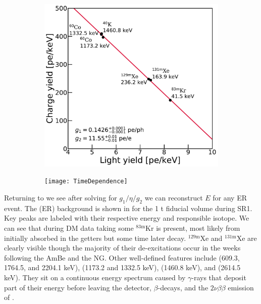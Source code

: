 \begin{figure}
    \centering
    \begin{subfigure}[t]{0.45\textwidth}
        \centering
        \includegraphics[width=\textwidth]{g1g2Anticorrelation}
    \end{subfigure}%
    \begin{subfigure}[t]{0.45\textwidth}
        \centering
        \texttt{[image: TimeDependence]}
    \end{subfigure}
    \caption{}
	\label{fig:calibrations_photon_charge_efficiences_g1_g2}
\end{figure}

Returning to  we see after solving for $g_1/\eta/g_2$ we can reconstruct $E$ for any ER event.  The (ER)
background is shown in  for the 1 t fiducial volume during SR1.  Key peaks are
labeled with their respective energy and responsible isotope.  We can see that during DM data taking some $\mathrm{^{83m}Kr}$ is present, most
likely from  initially absorbed in the getters but some time later decay.  $\mathrm{^{129m}Xe}$ and $\mathrm{^{131m}Xe}$ are clearly
visible though the majority of their de-excitations occur in the weeks following the AmBe and the NG.  Other well-defined features
include  (609.3, 1764.5, and 2204.1 keV),  (1173.2 and 1332.5 keV),  (1460.8 keV), and 
(2614.5 keV).  They sit on a continuous energy spectrum caused by $\gamma$-rays that deposit part of their energy before leaving the
detector, $\beta$-decays, and the $2 \nu \beta \beta$ emission of .

